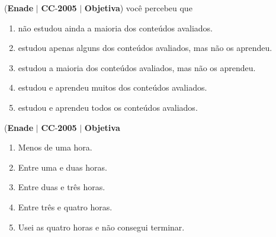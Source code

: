 \documentclass{exam}
\begin{document}
\begin{questions}
\question (\textbf{Enade} $|$ \textbf{CC}-\textbf{2005} $|$ \textbf{Objetiva})
você percebeu que
	\begin{enumerate}[label=\alph*)]
		\item  não estudou ainda a maioria dos conteúdos avaliados.
		\item  estudou apenas alguns dos conteúdos avaliados, mas não
os aprendeu.
		\item  estudou a maioria dos conteúdos avaliados, mas não os
aprendeu.
		\item  estudou e aprendeu muitos dos conteúdos avaliados.
		\item  estudou e aprendeu todos os conteúdos avaliados.
	\end{enumerate}

\question (\textbf{Enade} $|$ \textbf{CC}-\textbf{2005} $|$ \textbf{Objetiva}	\begin{enumerate}[label=\alph*)]
		\item  Menos de uma hora.
		\item  Entre uma e duas horas.
		\item  Entre duas e três horas.
		\item  Entre três e quatro horas.
		\item  Usei as quatro horas e não consegui terminar.
	\end{enumerate}

\end{questions}
\end{document}
